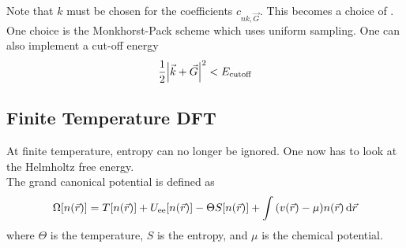\documentclass[12pt,a4paper,titlepage]{article}
\newcommand{\trm}[1]{\textrm{#1}} %
\newcommand{\ul}[1]{\underline{\smash{#1}}} %
\begin{document}
Note that $k$ must be chosen for the coefficients $c_{nk,\vec{G}}$. This becomes a choice of \ul{$k$-point sampling}. One choice is the Monkhorst-Pack scheme which uses uniform sampling. One can also implement a cut-off energy
\begin{equation}
\frac{1}{2}\abs{\vec{k}+\vec{G}}^{2}<E_{\trm{cutoff}}
\end{equation}

\begin{center}
\end{center}

\subsection{Finite Temperature DFT}
At finite temperature, entropy can no longer be ignored. One now has to look at the Helmholtz free energy.\\

The grand canonical potential is defined as
\begin{equation}
\Omega[n(\vec{r})]=T[n(\vec{r})]+U_{\trm{ee}}[n(\vec{r})]-\Theta S[n(\vec{r})]+\int\qty(v(\vec{r})-\mu)n(\vec{r})\dd{\vec{r}}
\end{equation}
where $\Theta$ is the temperature, $S$ is the entropy, and $\mu$ is the chemical potential.\\
\end{document}
